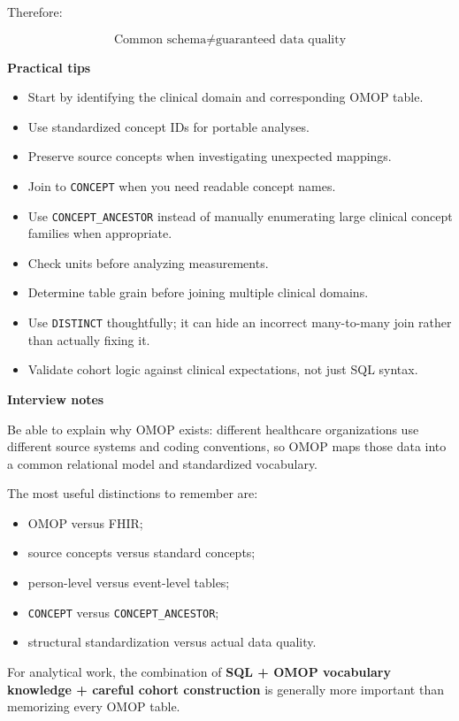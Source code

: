 \documentclass[11pt,letterpaper]{article}
\begin{document}
Therefore:

\[
\boxed{\text{Common schema} \neq \text{guaranteed data quality}}
\]

\textbf{Practical tips}

\begin{itemize}[leftmargin=*]
    \item Start by identifying the clinical domain and corresponding OMOP table.
    \item Use standardized concept IDs for portable analyses.
    \item Preserve source concepts when investigating unexpected mappings.
    \item Join to \texttt{CONCEPT} when you need readable concept names.
    \item Use \texttt{CONCEPT\_ANCESTOR} instead of manually enumerating large
    clinical concept families when appropriate.
    \item Check units before analyzing measurements.
    \item Determine table grain before joining multiple clinical domains.
    \item Use \texttt{DISTINCT} thoughtfully; it can hide an incorrect many-to-many
    join rather than actually fixing it.
    \item Validate cohort logic against clinical expectations, not just SQL syntax.
\end{itemize}

\textbf{Interview notes}

Be able to explain why OMOP exists: different healthcare organizations use
different source systems and coding conventions, so OMOP maps those data into
a common relational model and standardized vocabulary.

The most useful distinctions to remember are:

\begin{itemize}[leftmargin=*]
    \item OMOP versus FHIR;
    \item source concepts versus standard concepts;
    \item person-level versus event-level tables;
    \item \texttt{CONCEPT} versus \texttt{CONCEPT\_ANCESTOR};
    \item structural standardization versus actual data quality.
\end{itemize}

For analytical work, the combination of \textbf{SQL + OMOP vocabulary
knowledge + careful cohort construction} is generally more important than
memorizing every OMOP table.
\end{document}
